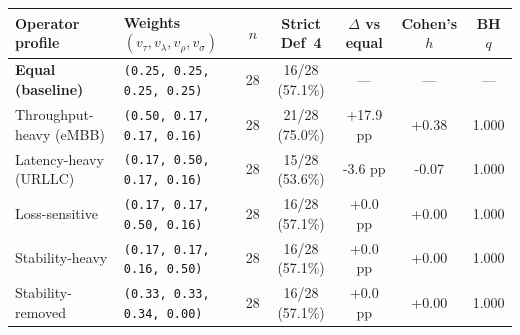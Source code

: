 \begin{tabular}{llccccc}
\toprule
\textbf{Operator profile} & \textbf{Weights $(v_\tau,v_\lambda,v_\rho,v_\sigma)$} & \textbf{$n$} & \textbf{Strict Def~4} & \textbf{$\Delta$ vs equal} & \textbf{Cohen's $h$} & \textbf{BH $q$} \\
\midrule
\textbf{Equal (baseline)} & \texttt{(0.25, 0.25, 0.25, 0.25)} & 28 & 16/28 (57.1\%) & — & — & — \\
Throughput-heavy (eMBB) & \texttt{(0.50, 0.17, 0.17, 0.16)} & 28 & 21/28 (75.0\%) & +17.9 pp & +0.38 & 1.000 \\
Latency-heavy (URLLC) & \texttt{(0.17, 0.50, 0.17, 0.16)} & 28 & 15/28 (53.6\%) & -3.6 pp & -0.07 & 1.000 \\
Loss-sensitive & \texttt{(0.17, 0.17, 0.50, 0.16)} & 28 & 16/28 (57.1\%) & +0.0 pp & +0.00 & 1.000 \\
Stability-heavy & \texttt{(0.17, 0.17, 0.16, 0.50)} & 28 & 16/28 (57.1\%) & +0.0 pp & +0.00 & 1.000 \\
Stability-removed & \texttt{(0.33, 0.33, 0.34, 0.00)} & 28 & 16/28 (57.1\%) & +0.0 pp & +0.00 & 1.000 \\
\bottomrule
\end{tabular}